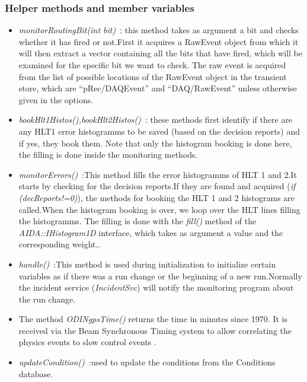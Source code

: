 \subsubsection{\textbf{Helper methods and member variables}}
\begin{itemize}
\item \textit{monitorRoutingBit(int bit)}~: this method takes as argument a bit and checks whether it has fired or not.First it acquires a RawEvent object from which it will then extract a vector containing all the bits that have fired, which will be examined for the specific bit we want to check. The raw event is acquired from the list of possible locations of the RawEvent object in the transient store, which are ``pRec/DAQEvent'' and ``DAQ/RawEvent'' unless otherwise given in the options.\par
\item \textit{bookHlt1Histos(),bookHlt2Histos()}~: these methods first identify if there are any HLT1 error histogramms to be saved (based on the decision reports) and if yes, they book them. Note that only the histogram booking is done here, the filling is done inside the monitoring methods.\par
\item \textit{monitorErrors()}~:This method fills the error histogramms of HLT 1 and 2.It starts by checking for the decision reports.If they are found and acquired (\textit{if (decReports!=0)}), the methods for booking the HLT 1 and 2 histograms are called.When the histogram booking is over, we loop over the HLT lines filling the histogramms. The filling is done with the \textit{fill()} method of the \textit{AIDA::IHistogram1D} interface, which takes as argument a value and the corresponding weight.\cite{aida1D}.\par
\item \textit{handle()}~:This method is used during initialization to initialize certain variables as if there was a run change or the beginning of a new run.Normally the incident service (\textit{IncidentSvc}) will notify the monitoring program about the run change.\par
\item The method \textit{ODINgpsTime()} returns the time in minutes since 1970. It is received via the Beam Synchronous Timing system to allow correlating the physics events to slow control events \cite{odin}.\par  
\item \textit{updateCondition()}~:used to update the conditions from the Conditions database.\par

\end{itemize}
